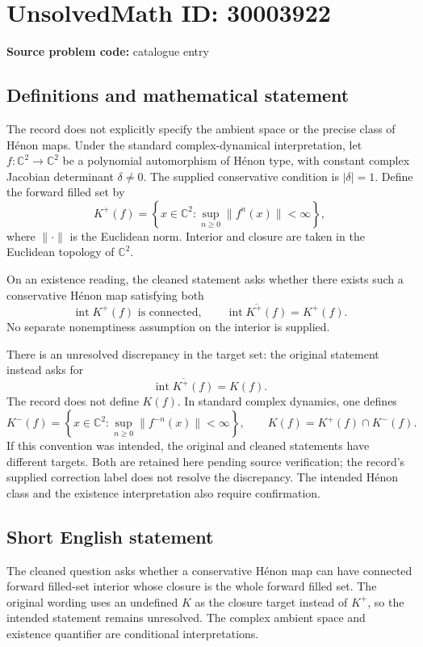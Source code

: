 \documentclass[11pt]{article}
\newcommand{\C}{\mathbb{C}}
\begin{document}
\section*{UnsolvedMath ID: 30003922}
\textbf{Source problem code:} catalogue entry
\subsection{Definitions and mathematical statement}
The record does not explicitly specify the ambient space or the precise class of Hénon maps. Under the standard complex-dynamical interpretation, let \(f\colon\C^2\to\C^2\) be a polynomial automorphism of Hénon type, with constant complex Jacobian determinant \(\delta\ne0\). The supplied conservative condition is \(|\delta|=1\). Define the forward filled set by
\[
K^+(f)=\left\{x\in\C^2:\sup_{n\ge0}\|f^n(x)\|<\infty\right\},
\]
where \(\|\cdot\|\) is the Euclidean norm. Interior and closure are taken in the Euclidean topology of \(\C^2\).

On an existence reading, the cleaned statement asks whether there exists such a conservative Hénon map satisfying both
\[
\operatorname{int}K^+(f)\text{ is connected},
\qquad
\overline{\operatorname{int}K^+(f)}=K^+(f).
\]
No separate nonemptiness assumption on the interior is supplied.

There is an unresolved discrepancy in the target set: the original statement instead asks for
\[
\overline{\operatorname{int}K^+(f)}=K(f).
\]
The record does not define \(K(f)\). In standard complex dynamics, one defines
\[
K^-(f)=\left\{x\in\C^2:\sup_{n\ge0}\|f^{-n}(x)\|<\infty\right\},
\qquad K(f)=K^+(f)\cap K^-(f).
\]
If this convention was intended, the original and cleaned statements have different targets. Both are retained here pending source verification; the record's supplied correction label does not resolve the discrepancy. The intended Hénon class and the existence interpretation also require confirmation.
\subsection{Short English statement}
The cleaned question asks whether a conservative Hénon map can have connected forward filled-set interior whose closure is the whole forward filled set. The original wording uses an undefined \(K\) as the closure target instead of \(K^+\), so the intended statement remains unresolved. The complex ambient space and existence quantifier are conditional interpretations.
\end{document}
